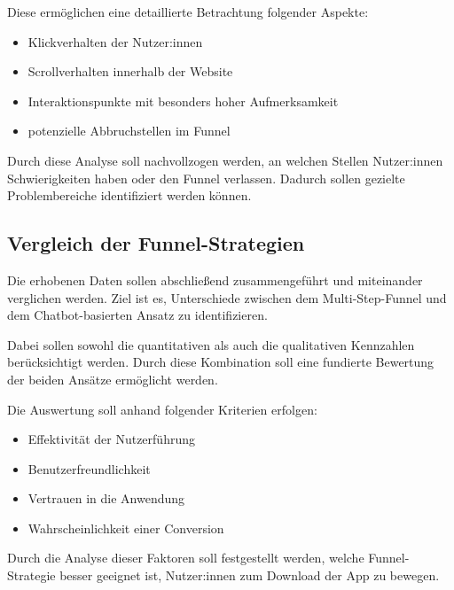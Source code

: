 Diese ermöglichen eine detaillierte Betrachtung folgender Aspekte:

\begin{itemize}
    \item Klickverhalten der Nutzer:innen
    \item Scrollverhalten innerhalb der Website
    \item Interaktionspunkte mit besonders hoher Aufmerksamkeit
    \item potenzielle Abbruchstellen im Funnel
\end{itemize}

Durch diese Analyse soll nachvollzogen werden, an welchen Stellen 
Nutzer:innen Schwierigkeiten haben oder den Funnel verlassen. 
Dadurch sollen gezielte Problembereiche identifiziert werden können.

\subsection{Vergleich der Funnel-Strategien}

Die erhobenen Daten sollen abschließend zusammengeführt 
und miteinander verglichen werden. Ziel ist es, Unterschiede 
zwischen dem Multi-Step-Funnel und dem Chatbot-basierten Ansatz 
zu identifizieren.

Dabei sollen sowohl die quantitativen als auch die 
qualitativen Kennzahlen berücksichtigt werden. Durch diese 
Kombination soll eine fundierte Bewertung der beiden Ansätze 
ermöglicht werden.

Die Auswertung soll anhand folgender Kriterien erfolgen:

\begin{itemize}
    \item Effektivität der Nutzerführung
    \item Benutzerfreundlichkeit
    \item Vertrauen in die Anwendung
    \item Wahrscheinlichkeit einer Conversion
\end{itemize}

Durch die Analyse dieser Faktoren soll 
festgestellt werden, welche Funnel-Strategie besser geeignet ist, 
Nutzer:innen zum Download der App zu bewegen.